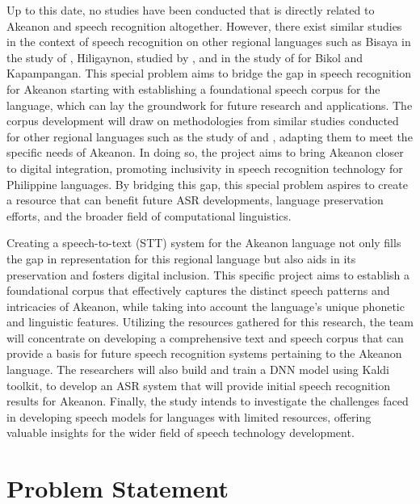 Up to this date, no studies have been conducted that is directly related to Akeanon and speech recognition altogether. However, there exist similar studies in the context of speech recognition on other regional languages such as Bisaya in the study of , Hiligaynon, studied by , and in the study of  for Bikol and Kapampangan. This special problem aims to bridge the gap in speech recognition for Akeanon starting with establishing a foundational speech corpus for the language, which can lay the groundwork for future research and applications. The corpus development will draw on methodologies from similar studies conducted for other regional languages such as the study of  and , adapting them to meet the specific needs of Akeanon. In doing so, the project aims to bring Akeanon closer to digital integration, promoting inclusivity in speech recognition technology for Philippine languages. By bridging this gap, this special problem aspires to create a resource that can benefit future ASR developments, language preservation efforts, and the broader field of computational linguistics.

Creating a speech-to-text (STT) system for the Akeanon language not only fills the gap in representation for this regional language but also aids in its preservation and fosters digital inclusion. This specific project aims to establish a foundational corpus that effectively captures the distinct speech patterns and intricacies of Akeanon, while taking into account the language's unique phonetic and linguistic features. Utilizing the resources gathered for this research, the team will concentrate on developing a comprehensive text and speech corpus that can provide a basis for future speech recognition systems pertaining to the Akeanon language. The researchers will also build and train a DNN model using Kaldi toolkit, to develop an ASR system that will provide initial speech recognition results for Akeanon. Finally, the study intends to investigate the challenges faced in developing speech models for languages with limited resources, offering valuable insights for the wider field of speech technology development.


\section{Problem Statement}
\label{sec:problemstatement}

